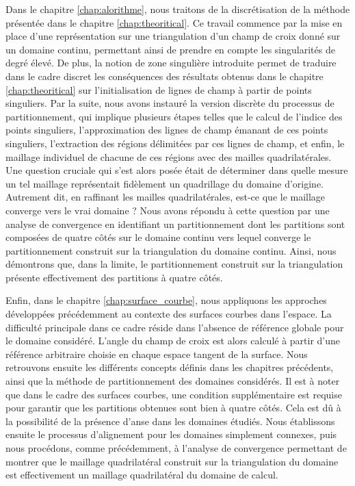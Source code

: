Dans le chapitre \ref{chap:alorithme}, nous traitons de la discrétisation de la méthode présentée dans le chapitre \ref{chap:theoritical}. Ce travail commence par la mise en place d'une représentation sur une triangulation d'un champ de croix donné sur un domaine continu, permettant ainsi de prendre en compte les singularités de degré élevé. De plus, la notion de zone singulière introduite permet de traduire dans le cadre discret les conséquences des résultats obtenus dans le chapitre \ref{chap:theoritical} sur l'initialisation de lignes de champ à partir de points singuliers. Par la suite, nous avons instauré la version discrète du processus de partitionnement, qui implique plusieurs étapes telles que le calcul de l'indice des points singuliers, l'approximation des lignes de champ émanant de ces points singuliers, l'extraction des régions délimitées par ces lignes de champ, et enfin, le maillage individuel de chacune de ces régions avec des mailles quadrilatérales. Une question cruciale qui s'est alors posée était de déterminer dans quelle mesure un tel maillage représentait fidèlement un quadrillage du domaine d'origine. Autrement dit, en raffinant les mailles quadrilatérales, est-ce que le maillage converge vers le vrai domaine ? Nous avons répondu à cette question par une analyse de convergence en identifiant un partitionnement dont les partitions sont composées de quatre côtés sur le domaine continu vers lequel converge le partitionnement construit sur la triangulation du domaine continu. Ainsi, nous démontrons que, dans la limite, le partitionnement construit sur la triangulation présente effectivement des partitions à quatre côtés.

Enfin, dans le chapitre \ref{chap:surface_courbe}, nous appliquons les approches développées précédemment au contexte des surfaces courbes dans l'espace. La difficulté principale dans ce cadre réside dans l'absence de référence globale pour le domaine considéré. L'angle du champ de croix est alors calculé à partir d'une référence arbitraire choisie en chaque espace tangent de la surface. Nous retrouvons ensuite les différents concepts définis dans les chapitres précédents, ainsi que la méthode de partitionnement des domaines considérés. Il est à noter que dans le cadre des surfaces courbes, une condition supplémentaire est requise pour garantir que les partitions obtenues sont bien à quatre côtés. Cela est dû à la possibilité de la présence d'anse dans les domaines étudiés. Nous établissons ensuite le processus d'alignement pour les domaines simplement connexes, puis nous procédons, comme précédemment, à l'analyse de convergence permettant de montrer que le maillage quadrilatéral construit sur la triangulation du domaine est effectivement un maillage quadrilatéral du domaine de calcul.

